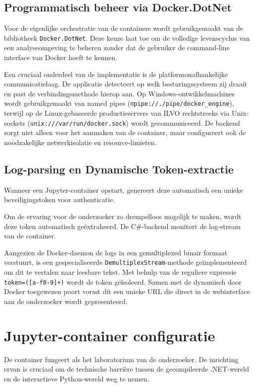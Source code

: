 \subsection{Programmatisch beheer via Docker.DotNet}
Voor de eigenlijke orchestratie van de containers wordt gebruikgemaakt van de bibliotheek \texttt{Docker.DotNet}. Deze keuze laat toe om de volledige levenscyclus van een analyseomgeving te beheren zonder dat de gebruiker de command-line interface van Docker hoeft te kennen.

{\sloppy Een cruciaal onderdeel van de implementatie is de platformonafhankelijke communicatielaag. De applicatie detecteert op welk besturingssysteem zij draait en past de verbindingsmethode hierop aan. Op Windows-ontwikkelmachines wordt gebruikgemaakt van named pipes (\nolinkurl{npipe://./pipe/docker\_engine}), terwijl op de Linux-gebaseerde productieservers van ILVO rechtstreeks via Unix-sockets (\nolinkurl{unix:///var/run/docker.sock}) wordt gecommuniceerd. De backend zorgt niet alleen voor het aanmaken van de container, maar configureert ook de noodzakelijke netwerkisolatie en resource-limieten.\par}

\subsection{Log-parsing en Dynamische Token-extractie}
Wanneer een Jupyter-container opstart, genereert deze automatisch een unieke beveiligingstoken voor authenticatie. {\sloppy Om de ervaring voor de onderzoeker zo drempelloos mogelijk te maken, wordt deze token automatisch geëxtraheerd. De C\#-backend monitort de log-stream van de container. \par}

Aangezien de Docker-daemon de logs in een gemultiplexed binair formaat verstuurt, is een gespecialiseerde \texttt{DemultiplexStream}-methode geïmplementeerd om dit te vertalen naar leesbare tekst. Met behulp van de reguliere expressie \texttt{token=([a-f0-9]+)} wordt de token geïsoleerd. Samen met de dynamisch door Docker toegewezen poort vormt dit een unieke URL die direct in de webinterface aan de onderzoeker wordt gepresenteerd.

\section{Jupyter-container configuratie}

De container fungeert als het laboratorium van de onderzoeker. De inrichting ervan is cruciaal om de technische barrière tussen de gecompileerde .NET-wereld en de interactieve Python-wereld weg te nemen.


